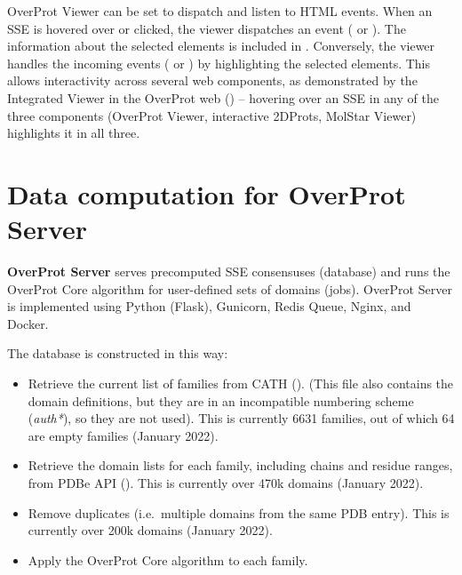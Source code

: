 \documentclass{article}
\begin{document}
OverProt Viewer can be set to dispatch and listen to HTML events. 
When an SSE is hovered over or clicked, the viewer dispatches an event ( or ). 
The information about the selected elements is included in .
Conversely, the viewer handles the incoming events ( 
or ) by highlighting the selected elements. 
This allows interactivity across several web components, as demonstrated by 
the Integrated Viewer in the OverProt web ()
-- hovering over an SSE in any of the three components (OverProt Viewer, interactive 2DProts, MolStar Viewer) highlights it in all three.





\section{Data computation for OverProt Server}

\textbf{OverProt Server} serves precomputed SSE consensuses (database)
and runs the OverProt Core algorithm for user-defined sets of domains (jobs). 
OverProt Server is implemented using Python (Flask), Gunicorn, Redis Queue, Nginx, and Docker.


The database is constructed in this way:

\begin{itemize}
\item
  Retrieve the current list of families from CATH
  ().
  (This file also contains the domain definitions, but they are in an
  incompatible numbering scheme (\emph{auth*}), so they are not
  used). This is currently 6631 families, out of which 64 are empty
  families (January 2022).
\item
  Retrieve the domain lists for each family, including chains and
  residue ranges, from PDBe API
  (). This is
  currently over 470k domains (January 2022).
\item
  Remove duplicates (i.e.~multiple domains from the same PDB entry).
  This is currently over 200k domains (January 2022).
\item
  Apply the OverProt Core algorithm to each family.
\end{itemize}
\end{document}
